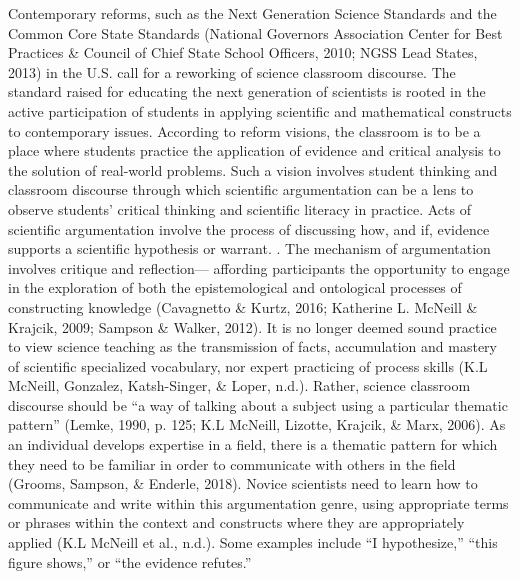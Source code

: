 \documentclass[11.5pt]{sig-alternate} %
\begin{document}
\begin{large}
Contemporary reforms, such as the Next Generation Science Standards and the Common Core State Standards (National Governors Association Center for Best Practices \& Council of Chief State School Officers, 2010; NGSS Lead States, 2013) in the U.S. call for a reworking of science classroom discourse. The standard raised for educating the next generation of scientists is rooted in the active participation of students in applying scientific and mathematical constructs to contemporary issues. According to reform visions, the classroom is to be a place where students practice the application of evidence and critical analysis to the solution of real-world problems. Such a vision involves student thinking and classroom discourse through which scientific argumentation can be a lens to observe students’ critical thinking and scientific literacy in practice. Acts of scientific argumentation involve the process of discussing how, and if, evidence supports a scientific hypothesis or warrant. . The mechanism of argumentation involves critique and reflection— affording participants the opportunity to engage in the exploration of both the epistemological and ontological processes of constructing knowledge (Cavagnetto \& Kurtz, 2016; Katherine L. McNeill \& Krajcik, 2009; Sampson \& Walker, 2012). It is no longer deemed sound practice to view science teaching as the transmission of facts, accumulation and mastery of scientific specialized vocabulary, nor expert practicing of process skills (K.L McNeill, Gonzalez, Katsh-Singer, \& Loper, n.d.). Rather, science classroom discourse should be “a way of talking about a subject using a particular thematic pattern” (Lemke, 1990, p. 125; K.L McNeill, Lizotte, Krajcik, \& Marx, 2006). As an individual develops expertise in a field, there is a thematic pattern for which they need to be familiar in order to communicate with others in the field (Grooms, Sampson, \& Enderle, 2018). Novice scientists need to learn how to communicate and write within this argumentation genre, using appropriate terms or phrases within the context and constructs where they are appropriately applied (K.L McNeill et al., n.d.). Some examples include “I hypothesize,” “this figure shows,” or “the evidence refutes.”


\end{large}
\end{document}
